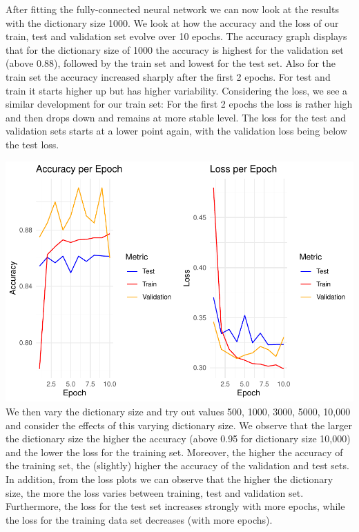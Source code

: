 \documentclass[
]{article}
\begin{document}
After fitting the fully-connected neural network we can now look at the
results with the dictionary size 1000. We look at how the accuracy and
the loss of our train, test and validation set evolve over 10 epochs.
The accuracy graph displays that for the dictionary size of 1000 the
accuracy is highest for the validation set (above 0.88), followed by the
train set and lowest for the test set. Also for the train set the
accuracy increased sharply after the first 2 epochs. For test and train
it starts higher up but has higher variability. Considering the loss, we
see a similar development for our train set: For the first 2 epochs the
loss is rather high and then drops down and remains at more stable
level. The loss for the test and validation sets starts at a lower point
again, with the validation loss being below the test loss.

\includegraphics{A4_files/figure-latex/unnamed-chunk-21-1.pdf} We then
vary the dictionary size and try out values 500, 1000, 3000, 5000,
10,000 and consider the effects of this varying dictionary size. We
observe that the larger the dictionary size the higher the accuracy
(above 0.95 for dictionary size 10,000) and the lower the loss for the
training set. Moreover, the higher the accuracy of the training set, the
(slightly) higher the accuracy of the validation and test sets. In
addition, from the loss plots we can observe that the higher the
dictionary size, the more the loss varies between training, test and
validation set. Furthermore, the loss for the test set increases
strongly with more epochs, while the loss for the training data set
decreases (with more epochs).
\end{document}
